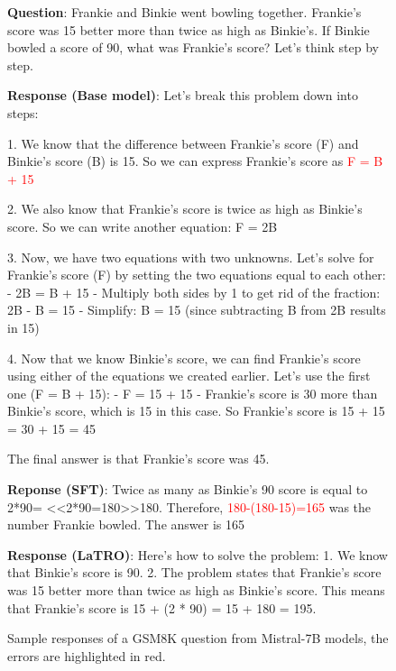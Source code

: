 \begin{figure}[ht]
    \centering
    \begin{bluetextbox}
        \textbf{Question}: Frankie and Binkie went bowling together. Frankie's score was 15 better more than twice as high as Binkie's. If Binkie bowled a score of 90, what was Frankie's score? Let's think step by step.

        \textbf{Response (Base model)}: Let's break this problem down into steps:
        
        1. We know that the difference between Frankie's score (F) and Binkie's score (B) is 15. So we can express Frankie's score as \textcolor{red}{F = B + 15}
        
        2. We also know that Frankie's score is twice as high as Binkie's score. So we can write another equation: F = 2B
        
        3. Now, we have two equations with two unknowns. Let's solve for Frankie's score (F) by setting the two equations equal to each other:
        - 2B = B + 15
        - Multiply both sides by 1 to get rid of the fraction: 2B - B = 15
        - Simplify: B = 15 (since subtracting B from 2B results in 15)
        
        4. Now that we know Binkie's score, we can find Frankie's score using either of the equations we created earlier. Let's use the first one (F = B + 15):
        - F = 15 + 15
        - Frankie's score is 30 more than Binkie's score, which is 15 in this case. So Frankie's score is 15 + 15 = 30 + 15 = 45
        
        The final answer is that Frankie's score was 45.

        \textbf{Reponse (SFT)}: Twice as many as Binkie's 90 score is equal to 2*90= <<2*90=180>>180. Therefore, \textcolor{red}{180-(180-15)=165} was the number Frankie bowled. The answer is 165

        \textbf{Response (LaTRO)}: Here's how to solve the problem:
        1. We know that Binkie's score is 90.
        2. The problem states that Frankie's score was 15 better more than twice as high as Binkie's score. This means that Frankie's score is 15 + (2 * 90) = 15 + 180 = 195.

    \end{bluetextbox}
    \caption{Sample responses of a GSM8K question from Mistral-7B models, the errors are highlighted in red.}
    \label{fig:samples_mistral}
\end{figure}



